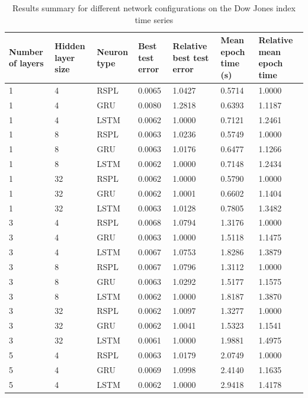 \documentclass[sn-apa]{sn-jnl}%
\begin{document}
\begin{table}[H]
\caption{Results summary for different network configurations on the Dow Jones index time series}\label{table1}
\begin{tabular}{|p{1.4cm}|p{1.4cm}|p{1.4cm}|p{1.5cm}|p{2.5cm}|p{1.9cm}|p{2cm}|}
\hline
Number of layers & Hidden layer size & Neuron type & Best test error & Relative best test error & Mean epoch time (s) & Relative mean epoch time\\
\hline
 1 &   4 &   RSPL & 0.0065 & 1.0427 & 0.5714 &  1.0000 \\
\hline
 1 &   4 &   GRU & 0.0080 & 1.2818 & 0.6393 &  1.1187 \\
\hline
 1 &   4 &  LSTM & 0.0062 & 1.0000 & 0.7121 &  1.2461 \\
\hline
 1 &   8 &   RSPL & 0.0063 & 1.0236 & 0.5749 &  1.0000 \\
\hline
 1 &   8 &   GRU & 0.0063 & 1.0176 & 0.6477 &  1.1266 \\
\hline
 1 &   8 &  LSTM & 0.0062 & 1.0000 & 0.7148 &  1.2434 \\
\hline
 1 &  32 &   RSPL & 0.0062 & 1.0000 & 0.5790 &  1.0000 \\
\hline
 1 &  32 &   GRU & 0.0062 & 1.0001 & 0.6602 &  1.1404 \\
\hline
 1 &  32 &  LSTM & 0.0063 & 1.0128 & 0.7805 &  1.3482 \\
\hline
 3 &   4 &   RSPL & 0.0068 & 1.0794 & 1.3176 &  1.0000 \\
\hline
 3 &   4 &   GRU & 0.0063 & 1.0000 & 1.5118 &  1.1475 \\
\hline
 3 &   4 &  LSTM & 0.0067 & 1.0753 & 1.8286 &  1.3879 \\
\hline
 3 &   8 &   RSPL & 0.0067 & 1.0796 & 1.3112 &  1.0000 \\
\hline
 3 &   8 &   GRU & 0.0063 & 1.0292 & 1.5177 &  1.1575 \\
\hline
 3 &   8 &  LSTM & 0.0062 & 1.0000 & 1.8187 &  1.3870 \\
\hline
 3 &  32 &   RSPL & 0.0062 & 1.0097 & 1.3277 &  1.0000 \\
\hline
 3 &  32 &   GRU & 0.0062 & 1.0041 & 1.5323 &  1.1541 \\
\hline
 3 &  32 &  LSTM & 0.0061 & 1.0000 & 1.9881 &  1.4975 \\
\hline
 5 &   4 &   RSPL & 0.0063 & 1.0179 & 2.0749 &  1.0000 \\
\hline
 5 &   4 &   GRU & 0.0069 & 1.0998 & 2.4140 &  1.1635 \\
\hline
 5 &   4 &  LSTM & 0.0062 & 1.0000 & 2.9418 &  1.4178 \\

\end{tabular}
\end{table}
\end{document}
